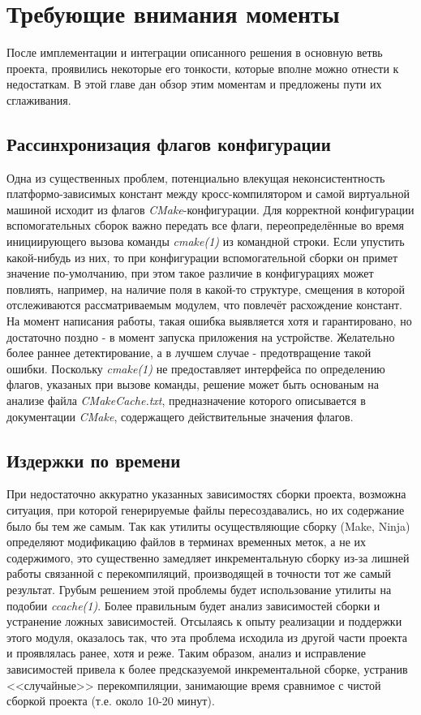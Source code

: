 \chapter{Требующие внимания моменты}
\label{sec:Chapter4} 

После имплементации и интеграции описанного решения в основную ветвь проекта, проявились некоторые его тонкости, которые вполне можно отнести к недостаткам. В этой главе дан обзор этим моментам и предложены пути их сглаживания.

\section{Рассинхронизация флагов конфигурации}
Одна из существенных проблем, потенциально влекущая неконсистентность платформо-зависимых констант между кросс-компилятором и самой виртуальной машиной исходит из флагов \textit{CMake}-конфигурации. Для корректной конфигурации вспомогательных сборок важно передать все флаги, переопределённые во время инициирующего вызова команды \textit{cmake(1)} из командной строки. Если упустить какой-нибудь из них, то при конфигурации вспомогательной сборки он примет значение по-умолчанию, при этом такое различие в конфигурациях может повлиять, например, на наличие поля в какой-то структуре, смещения в которой отслеживаются рассматриваемым модулем, что повлечёт расхождение констант.
На момент написания работы, такая ошибка выявляется хотя и гарантировано, но достаточно поздно - в момент запуска приложения на устройстве.
Желательно более раннее детектирование, а в лучшем случае - предотвращение такой ошибки.
Поскольку \textit{cmake(1)} не предоставляет интерфейса по определению флагов, указаных при вызове команды, решение может быть основаным на анализе файла \textit{CMakeCache.txt}, предназначение которого описывается в документации \textit{CMake}, содержащего действительные значения флагов. 

\section{Издержки по времени}
При недостаточно аккуратно указанных зависимостях сборки проекта, возможна ситуация, при которой генерируемые файлы пересоздавались, но их содержание было бы тем же самым. Так как утилиты осуществляющие сборку (Make, Ninja) определяют модификацию файлов в терминах временных меток, а не их содержимого, это существенно замедляет инкрементальную сборку из-за лишней работы связанной с перекомпиляций, производящей в точности тот же самый результат.
Грубым решением этой проблемы будет использование утилиты на подобии \textit{ccache(1)}.
Более правильным будет анализ зависимостей сборки и устранение ложных зависимостей.
Отсылаясь к опыту реализации и поддержки этого модуля, оказалось так, что эта проблема исходила из другой части проекта и проявлялась ранее, хотя и реже. Таким образом, анализ и исправление зависимостей привела к более предсказуемой инкрементальной сборке, устранив <<случайные>> перекомпиляции, занимающие время сравнимое с чистой сборкой проекта (т.е. около 10-20 минут).

